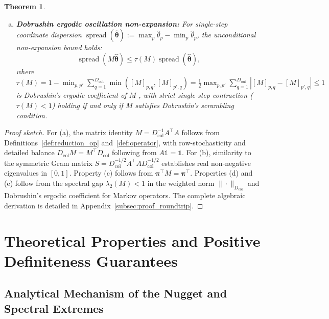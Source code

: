 \documentclass[default,sn-mathphys,Numbered]{sn-jnl}
\theoremstyle{thmstyleone}
\newtheorem{theorem}{Theorem}
\theoremstyle{thmstylethree}
\theoremstyle{thmstyletwo}
\newcommand{\inp}{\text{in}}
\newcommand{\outp}{\text{out}}
\begin{document}
\begin{theorem}
\begin{enumerate}[(a)]
\begin{equation}
    \end{equation}
    where $\|v\|_{D_{\mathrm{col}}} = \sqrt{v^\top D_{\mathrm{col}} v} = \sqrt{D_{\inp}} \|v\|_{\bm{\pi}}$.
    \item[(e)] \textbf{Dobrushin ergodic oscillation non-expansion:} For single-step coordinate dispersion $\operatorname{spread}(\hat{\bm{\theta}}) := \max_p \hat{\theta}_p - \min_p \hat{\theta}_p$, the unconditional non-expansion bound holds:
    \begin{equation}
    \operatorname{spread}(M \hat{\bm{\theta}}) \le \tau(M) \operatorname{spread}(\hat{\bm{\theta}}),
    \end{equation}
    where $\tau(M) = 1 - \min_{p, p'} \sum_{q=1}^{D_{\outp}} \min([M]_{p, q}, [M]_{p', q}) = \frac{1}{2} \max_{p, p'} \sum_{q=1}^{D_{\outp}} |[M]_{p, q} - [M]_{p', q}| \le 1$ is Dobrushin's ergodic coefficient of $M$ \citep{dobrushin1956,seneta2006non}, with strict single-step contraction ($\tau(M) < 1$) holding if and only if $M$ satisfies Dobrushin's scrambling condition.
\end{enumerate}
\end{theorem}

\begin{proof}[Proof sketch]
For (a), the matrix identity $M = D_{\mathrm{col}}^{-1} A^\top A$ follows from Definitions~\ref{def:reduction_op} and~\ref{def:operator}, with row-stochasticity and detailed balance $D_{\mathrm{col}} M = M^\top D_{\mathrm{col}}$ following from $A \mathds{1} = \mathds{1}$. For (b), similarity to the symmetric Gram matrix $S = D_{\mathrm{col}}^{-1/2} A^\top A D_{\mathrm{col}}^{-1/2}$ establishes real non-negative eigenvalues in $[0, 1]$. Property (c) follows from $\bm{\pi}^\top M = \bm{\pi}^\top$. Properties (d) and (e) follow from the spectral gap $\lambda_2(M) < 1$ in the weighted norm $\|\cdot\|_{D_{\mathrm{col}}}$ and Dobrushin's ergodic coefficient for Markov operators. The complete algebraic derivation is detailed in Appendix~\ref{subsec:proof_roundtrip}.
\end{proof}

\section{Theoretical Properties and Positive Definiteness Guarantees}
\label{sec:theorems}


\subsection{Analytical Mechanism of the Nugget and Spectral Extremes}
\label{subsec:nugget_spectrum}
\end{document}
